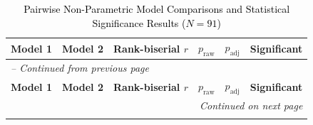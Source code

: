 \documentclass[a4paper,fleqn]{cas-sc}
\begin{document}
\begin{longtable}{l l c c c c}
\caption{\textcolor{black}{Pairwise Non-Parametric Model Comparisons and Statistical Significance Results ($N = 91$)}} 
\label{tab:app_statistical_comparisons} \\
\toprule
\textbf{Model 1} & \textbf{Model 2} & \textbf{Rank-biserial $r$} & \textbf{$p_{\text{raw}}$} & \textbf{$p_{\text{adj}}$} & \textbf{Significant} \\ 
\midrule
\endfirsthead

\multicolumn{6}{l}{\textit{-- Continued from previous page}} \\
\toprule
\textbf{Model 1} & \textbf{Model 2} & \textbf{Rank-biserial $r$} & \textbf{$p_{\text{raw}}$} & \textbf{$p_{\text{adj}}$} & \textbf{Significant} \\ 
\midrule
\endhead

\midrule
\multicolumn{6}{r}{\textit{Continued on next page}} \\
\endfoot

\bottomrule
\endlastfoot


\end{longtable}
\end{document}
